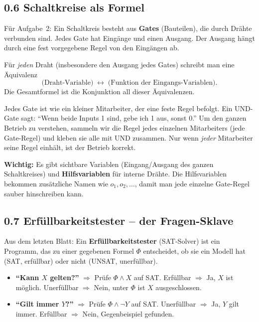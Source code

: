 \documentclass[a4paper,12pt]{article}
\begin{document}
\subsection*{0.6 Schaltkreise als Formel}

F\"ur Aufgabe~2: Ein Schaltkreis besteht aus \textbf{Gates}
(Bauteilen), die durch Dr\"ahte verbunden sind. Jedes Gate hat
Eing\"ange und einen Ausgang. Der Ausgang h\"angt durch eine fest
vorgegebene Regel von den Eing\"angen ab.

\begin{merkbox}[title={Strategie: Schaltkreis $\to$ Formel}]
F\"ur \emph{jeden} Draht (insbesondere den Ausgang jedes Gates)
schreibt man eine \"Aquivalenz
\[
\text{(Draht-Variable)} \;\leftrightarrow\; \text{(Funktion der Eingangs-Variablen)}.
\]
Die Gesamtformel ist die Konjunktion all dieser \"Aquivalenzen.
\end{merkbox}

\begin{analogie}
Jedes Gate ist wie ein kleiner Mitarbeiter, der eine feste Regel
befolgt. Ein UND-Gate sagt: "`Wenn beide Inputs 1 sind, gebe ich
1 aus, sonst 0."' Um den ganzen Betrieb zu verstehen, sammeln wir
die Regel jedes einzelnen Mitarbeiters (jede Gate-Regel) und
kleben sie alle mit UND zusammen. Nur wenn \emph{jeder} Mitarbeiter
seine Regel einh\"alt, ist der Betrieb korrekt.
\end{analogie}

\textbf{Wichtig:} Es gibt sichtbare Variablen (Eingang/Ausgang des
ganzen Schaltkreises) und \textbf{Hilfsvariablen} f\"ur interne
Dr\"ahte. Die Hilfsvariablen bekommen zus\"atzliche Namen wie $o_1,
o_2, \ldots$, damit man jede einzelne Gate-Regel sauber hinschreiben
kann.

\subsection*{0.7 Erf\"ullbarkeitstester -- der Fragen-Sklave}

Aus dem letzten Blatt: Ein \textbf{Erf\"ullbarkeitstester} (SAT-Solver)
ist ein Programm, das zu einer gegebenen Formel $\Phi$ entscheidet,
ob sie ein Modell hat (SAT, erf\"ullbar) oder nicht (UNSAT,
unerf\"ullbar).

\begin{merkbox}[title={Zwei wichtige Fragen-Muster}]
\begin{itemize}[nosep]
\item \textbf{"`Kann $X$ gelten?"'} $\Rightarrow$ Pr\"ufe
      $\Phi \wedge X$ auf SAT.
      Erf\"ullbar $\Rightarrow$ Ja, $X$ ist m\"oglich.
      Unerf\"ullbar $\Rightarrow$ Nein, unter $\Phi$ ist $X$
      ausgeschlossen.
\item \textbf{"`Gilt immer $Y$?"'} $\Rightarrow$ Pr\"ufe
      $\Phi \wedge \neg Y$ auf SAT.
      Unerf\"ullbar $\Rightarrow$ Ja, $Y$ gilt immer.
      Erf\"ullbar $\Rightarrow$ Nein, Gegenbeispiel gefunden.
\end{itemize}
\end{merkbox}
\end{document}

